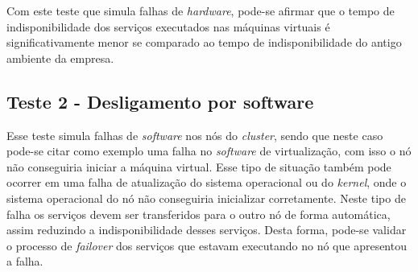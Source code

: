 Com este teste que simula falhas de \textit{hardware}, pode-se afirmar que o tempo de indisponibilidade dos serviços executados nas 
máquinas virtuais é significativamente menor se comparado ao tempo de indisponibilidade do antigo ambiente da empresa.


% 


\subsection{Teste 2 - Desligamento por software}

Esse teste simula falhas de \textit{software} nos nós do \textit{cluster}, sendo que neste caso pode-se citar como exemplo uma falha no 
\textit{software} de virtualização, com isso o nó não conseguiria iniciar a máquina virtual. Esse tipo de situação também pode ocorrer em uma 
falha de atualização do sistema operacional ou do \textit{kernel}, onde o sistema operacional do nó não conseguiria inicializar corretamente.
Neste tipo de falha os serviços devem ser transferidos para o outro nó de forma automática, assim reduzindo a indisponibilidade desses serviços. 
Desta forma, pode-se validar o processo de \textit{failover} dos serviços que estavam executando no nó que apresentou a falha.

